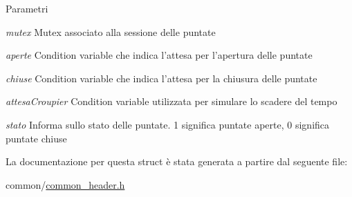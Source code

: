 \begin{DoxyParams}{Parametri}
\item[{\em mutex}]Mutex associato alla sessione delle puntate \item[{\em aperte}]Condition variable che indica l'attesa per l'apertura delle puntate \item[{\em chiuse}]Condition variable che indica l'attesa per la chiusura delle puntate \item[{\em attesaCroupier}]Condition variable utilizzata per simulare lo scadere del tempo \item[{\em stato}]Informa sullo stato delle puntate. 1 significa puntate aperte, 0 significa puntate chiuse \end{DoxyParams}


La documentazione per questa struct è stata generata a partire dal seguente file:\begin{DoxyCompactItemize}
\item 
common/\hyperlink{common__header_8h}{common\_\-header.h}\end{DoxyCompactItemize}
